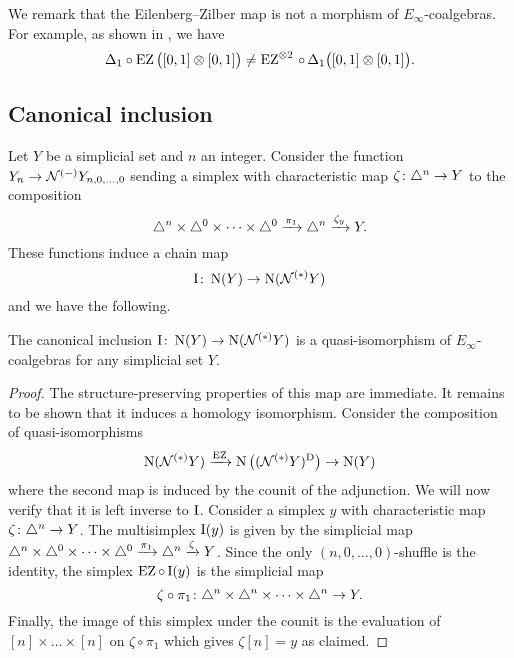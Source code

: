 
We remark that the Eilenberg--Zilber map is not a morphism of $E_\infty$-coalgebras.
For example, as shown in \cite[\S5.4]{medina2022cube_einfty}, we have
\[
\Delta_1 \circ \operatorname{EZ}\big([0,1] \otimes [0,1]\big) \neq
\operatorname{EZ} ^{\otimes 2}\, \circ \, \Delta_1\big([0,1] \otimes [0,1]\big).
\]

\subsection{Canonical inclusion}\label{ss:inclusion}

Let $Y$ be a simplicial set and $n$ an integer.
Consider the function $Y_n \to \mathcal{N}^{(-)} Y_{n,0,\dots,0}$ sending a simplex with characteristic map $\zeta \colon \triangle^n \to Y$ to the composition
\[
\triangle^n \times \triangle^{0}\times\dots\times\triangle^{0} \xrightarrow{\pi_1} \triangle^n \xrightarrow{\zeta_y} Y.
\]
These functions induce a chain map
\[
\operatorname{I} \colon \operatorname{N}(Y) \to \operatorname{N}(\mathcal{N}^{(*)} Y)
\]
and we have the following.

\begin{theorem}
	The canonical inclusion $\operatorname{I} \colon \operatorname{N}(Y) \to \operatorname{N}(\mathcal{N}^{(*)} Y)$ is a quasi-isomorphism of $E_\infty$-coalgebras for any simplicial set $Y$.
\end{theorem}

\begin{proof}
	The structure-preserving properties of this map are immediate.
	It remains to be shown that it induces a homology isomorphism.
	Consider the composition of quasi-isomorphisms
	\[
	\operatorname{N}(\mathcal{N}^{(*)} Y) \xrightarrow{\operatorname{EZ}}
	\operatorname{N}\big((\mathcal{N}^{(*)} Y)^{\mathrm{D}}\big) \to
	\operatorname{N}(Y)
	\]
	where the second map is induced by the counit of the adjunction.
	We will now verify that it is left inverse to $\operatorname{I}$.
	Consider a simplex $y$ with characteristic map $\zeta \colon \triangle^n \to Y$.
	The multisimplex $\operatorname{I}(y)$ is given by the simplicial map $\triangle^n \times \triangle^{0}\times\dots\times\triangle^{0} \xrightarrow{\pi_1} \triangle^n \xrightarrow{\zeta} Y$.
	Since the only $(n,0,\dots,0)$-shuffle is the identity, the simplex $\operatorname{EZ} \circ \operatorname{I} (y)$ is the simplicial map
	\[
	\zeta \circ \pi_1 \colon \triangle^n \times \triangle^{n}\times\dots\times\triangle^{n} \to Y.
	\]
	Finally, the image of this simplex under the counit is the evaluation of $[n] \times\dots\times [n]$ on $\zeta \circ \pi_1$ which gives $\zeta[n] = y$ as claimed.
\end{proof}

